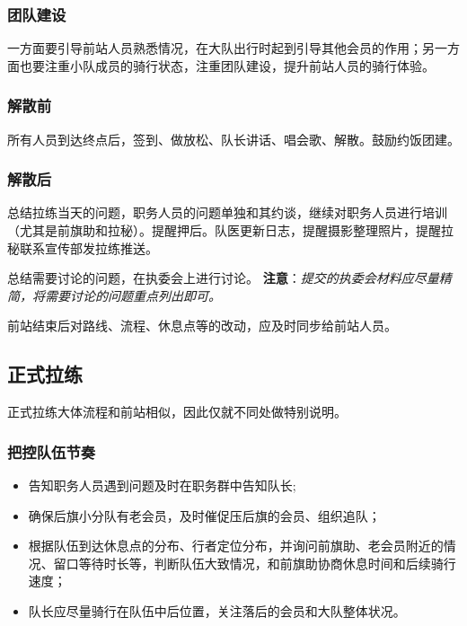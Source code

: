\documentclass[UTF8]{ctexart}
\begin{document}
\subsubsection{团队建设}

一方面要引导前站人员熟悉情况，在大队出行时起到引导其他会员的作用；另一方面也要注重小队成员的骑行状态，注重团队建设，提升前站人员的骑行体验。

\subsubsection{解散前}

所有人员到达终点后，签到、做放松、队长讲话、唱会歌、解散。鼓励约饭团建。

\subsubsection{解散后}

总结拉练当天的问题，职务人员的问题单独和其约谈，继续对职务人员进行培训（尤其是前旗助和拉秘）。提醒押后。队医更新日志，提醒摄影整理照片，提醒拉秘联系宣传部发拉练推送。

总结需要讨论的问题，在执委会上进行讨论。
\textbf{注意}：\textit{提交的执委会材料应尽量精简，将需要讨论的问题重点列出即可。}

前站结束后对路线、流程、休息点等的改动，应及时同步给前站人员。

\subsection{正式拉练}

正式拉练大体流程和前站相似，因此仅就不同处做特别说明。

\subsubsection{把控队伍节奏}

\begin{itemize}[nosep,left=2em]
    \item 告知职务人员遇到问题及时在职务群中告知队长;
    \item 确保后旗小分队有老会员，及时催促压后旗的会员、组织追队；
    \item 根据队伍到达休息点的分布、行者定位分布，并询问前旗助、老会员附近的情况、留口等待时长等，判断队伍大致情况，和前旗助协商休息时间和后续骑行速度；
    \item 队长应尽量骑行在队伍中后位置，关注落后的会员和大队整体状况。
\end{itemize}
\end{document}
